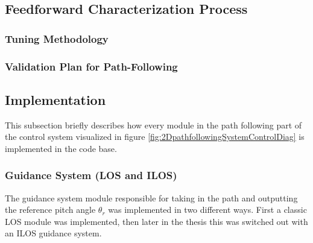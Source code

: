 \subsection{Feedforward Characterization Process}

\subsubsection{Tuning Methodology}

\subsubsection{Validation Plan for Path-Following}


\subsection{Implementation}
This subsection briefly describes how every module in the path following part of the control system visualized in figure \ref{fig:2DpathfollowingSystemControlDiag} is implemented in the code base. 

\subsubsection{Guidance System (LOS and ILOS)}
The guidance system module responsible for taking in the path and outputting the reference pitch angle \(\theta_r\) was implemented in two different ways. First a classic LOS module was implemented, then later in the thesis this was switched out with an ILOS guidance system.
